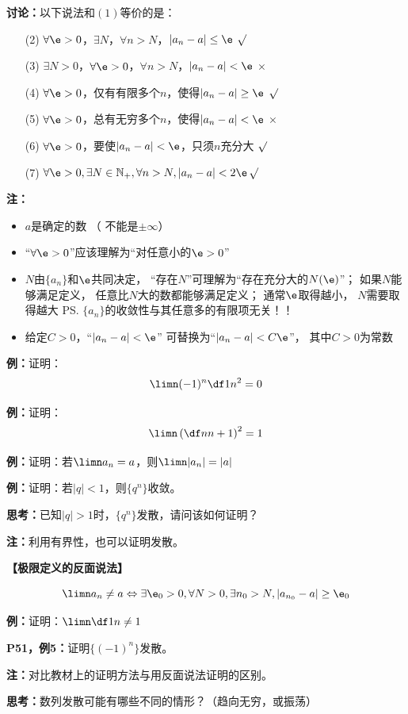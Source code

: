 {\bf 讨论：}以下说法和$(1)$等价的是：

\begin{enumerate}
  \setlength{\itemindent}{1cm}
  \item[(2)] $\forall\e>0$，$\exists N$，$\forall
  n>N$，$|a_n-a|\leq\e$ \hfill{$\surd$} 
  \item[(3)] $\exists N>0$，$\forall\e>0$，$\forall
  n>N$，$|a_n-a|<\e$ \hfill{$\times$} 
  \item[(4)] $\forall\e>0$，仅有有限多个$n$，使得$|a_n-a|\geq\e$
  \hfill{$\surd$} 
  \item[(5)] $\forall\e>0$，总有无穷多个$n$，使得$|a_n-a|<\e$
  \hfill{$\times$} 
  \item[(6)] $\forall\e>0$，要使$|a_n-a|<\e$，只须$n$充分大 \hfill{$\surd$}
  \item[(7)] $\forall\e>0,\exists N\in\mathbb{N}_+,\forall
  n>N,|a_n-a|<2\e$\hfill{$\surd$}
\end{enumerate}

{\bf 注：}

\begin{itemize}
  \setlength{\itemindent}{1cm}
  \item $a$是确定的数 （ {不能是$\pm\infty$}） 
  \item “$\forall\e>0$”应该理解为{“对任意小的$\e>0$”}
  \item $N$由$\{a_n\}$和$\e$共同决定， “存在$N$”可理解为{“存在充分大的$N(\e)$}”； 
   {如果$N$能够满足定义， 任意比$N$大的数都能够满足定义； 通常$\e$取得越小，
  $N$需要取得越大} \ps{$\{a_n\}$的收敛性与其任意多的有限项无关！！}
  \item 给定$C>0$，“$|a_n-a|<\e$” 可替换为{“$|a_n-a|<C\e$”}， 其中$C>0$为常数
\end{itemize}

{\bf 例：}证明：
$$\limn(-1)^n\df1{n^2}=0$$

{\bf 例：}证明：
$$\limn\left(\df n{n+1}\right)^2=1$$

{\bf 例：}证明：若$\limn a_n=a$，则$\limn|a_n|=|a|$

{\bf 例：}证明：若$|q|<1$，则$\{q^n\}$收敛。

{\bf 思考：}已知$|q|>1$时，$\{q^n\}$发散，请问该如何证明？

{\bf 注：}利用有界性，也可以证明发散。

\begin{shaded}
	{\bf 【极限定义的反面说法】}
	
	$$\limn a_n\neq a\Leftrightarrow\exists\e_0>0,\forall N>0,\exists
		n_0>N,|a_{n_0}-a|\geq\e_0$$
	
	{\bf 例：}证明：$\limn\df 1n\neq 1$
	
	{\bf P51，例5：}证明$\{(-1)^n\}$发散。 
	
	{\bf 注：}对比教材上的证明方法与用反面说法证明的区别。
	
	{\bf 思考：}数列发散可能有哪些不同的情形？（趋向无穷，或振荡）
	
\end{shaded}

